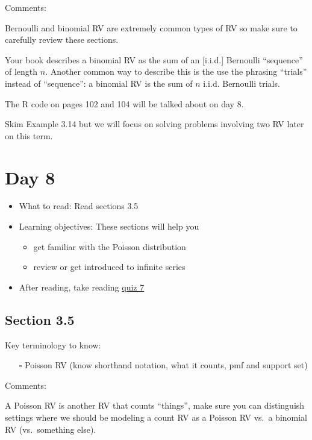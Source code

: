 \documentclass[
  letterpaper,
]{scrbook}
\providecommand{\tightlist}{%
  \setlength{\itemsep}{0pt}\setlength{\parskip}{0pt}}\usepackage{longtable,booktabs,array}
\begin{document}
Comments:

Bernoulli and binomial RV are extremely common types of RV so make sure
to carefully review these sections.

Your book describes a binomial RV as the sum of an {[}i.i.d.{]}
Bernoulli ``sequence'' of length \(n\). Another common way to describe
this is the use the phrasing ``trials'' instead of ``sequence'': a
binomial RV is the sum of \(n\) i.i.d. Bernoulli trials.

The R code on pages 102 and 104 will be talked about on day 8.

Skim Example 3.14 but we will focus on solving problems involving two RV
later on this term.

\section*{Day 8}\label{day-8}


\begin{itemize}
\item
  What to read: Read sections 3.5
\item
  Learning objectives: These sections will help you

  \begin{itemize}
  \tightlist
  \item
    get familiar with the Poisson distribution
  \item
    review or get introduced to infinite series
  \end{itemize}
\item
  After reading, take reading
  \href{https://forms.gle/GkduDGR42NEbizfE6}{quiz 7}
\end{itemize}

\subsection*{Section 3.5}\label{section-3.5}

Key terminology to know:

\begin{itemize}
\tightlist
\item[$\square$]
  Poisson RV (know shorthand notation, what it counts, pmf and support
  set)
\end{itemize}

Comments:

A Poisson RV is another RV that counts ``things'', make sure you can
distinguish settings where we should be modeling a count RV as a Poisson
RV vs.~a binomial RV (vs.~something else).
\end{document}

